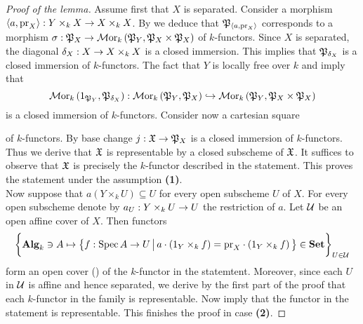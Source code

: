 \begin{proof}[Proof of the lemma]
Assume first that $X$ is separated. Consider a morphism $\langle a, \mathrm{pr}_X\rangle:Y\times_kX\rightarrow X\times_k X$. By {\cite[Corollary 4.6]{Monoid_k_functors}} we deduce that ${\mathfrak P}_{\langle a, \mathrm{pr}_X\rangle}$ corresponds to a morphism $\sigma:{\mathfrak P}_X\rightarrow \mathcal{M}\mathrm{or}_k\left({\mathfrak P}_Y, {\mathfrak P}_X\times {\mathfrak P}_X\right)$ of $k$-functors. Since $X$ is separated, the diagonal $\delta_X:X\rightarrow X\times_k X$ is a closed immersion. This implies that ${\mathfrak P}_{\delta_X}$ is a closed immersion of $k$-functors. The fact that $Y$ is locally free over $k$ and {\cite[Theorem 6.2]{kfunctors}} imply that
$$\mathcal{M}\mathrm{or}_k\left(1_{{\mathfrak P}_Y}, {\mathfrak P}_{\delta_X} \right):\mathcal{M}\mathrm{or}_k\left( {\mathfrak P}_{Y},{\mathfrak P}_{X} \right) \hookrightarrow \mathcal{M}\mathrm{or}_k\left( {\mathfrak P}_{Y}, {\mathfrak P}_{X} \times {\mathfrak P}_{X} \right)$$
is a closed immersion of $k$-functors. Consider now a cartesian square
\begin{center}
\end{center}
of $k$-functors. By base change $j:{\mathfrak X}\rightarrow {\mathfrak P}_X$ is a closed immersion of $k$-functors. Thus we derive that ${\mathfrak X}$ is representable by a closed subscheme of ${\mathfrak X}$. It suffices to observe that ${\mathfrak X}$ is precisely the $k$-functor described in the statement. This proves the statement under the assumption \textbf{(1)}.\\
Now suppose that $a\left(Y\times_kU\right) \subseteq U$ for every open subscheme $U$ of $X$. For every open subscheme denote by $a_U:Y\times_kU\rightarrow U$ the restriction of $a$. Let ${\mathcal U}$ be an open affine cover of $X$. Then functors
$$\bigg\{\mathbf{Alg}_k\ni A\mapsto \big\{f:\mathrm{Spec}\, A\rightarrow U\,\big|\,a\cdot \left(1_Y\times_k f\right) = \mathrm{pr}_X\cdot \left(1_Y\times_k f\right)\big\}\in \mathbf{Set} \bigg\}_{U\in {\mathcal U}}$$
form an open cover ({\cite[Definition 4.5]{kfunctors}}) of the $k$-functor in the statemtent. Moreover, since each $U$ in ${\mathcal U}$ is affine and hence separated, we derive by the first part of the proof that each $k$-functor in the family is representable. Now {\cite[Theorem 4.6]{kfunctors}} imply that the functor in the statement is representable. This finishes the proof in case \textbf{(2)}.
\end{proof}

